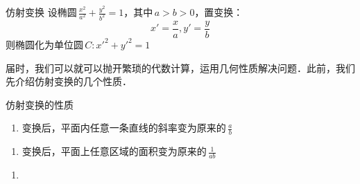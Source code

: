 \begin{definition}{仿射变换}
设椭圆\,\(\frac{x^2}{a^2}+\frac{y^2}{b^2}=1\)，其中\,\(a>b>0\)，置变换：
$$x'=\frac{x}{a},y'=\frac{y}{b}$$
则椭圆化为单位圆\,\(C:x'^2+y'^2=1\)
\end{definition}
届时，我们可以就可以抛开繁琐的代数计算，运用几何性质解决问题．此前，我们先介绍仿射变换的几个性质．
\begin{lemma}{仿射变换的性质}
\begin{enumerate}{1}
\item 变换后，平面内任意一条直线的斜率变为原来的\,\(\frac{a}{b}\)
\end{enumerate}
\begin{enumerate}{2}
\item 变换后，平面上任意区域的面积变为原来的\,\(\frac1{ab}\)
\end{enumerate}
\begin{enumerate}
\item 
\end{enumerate}
\end{lemma}
